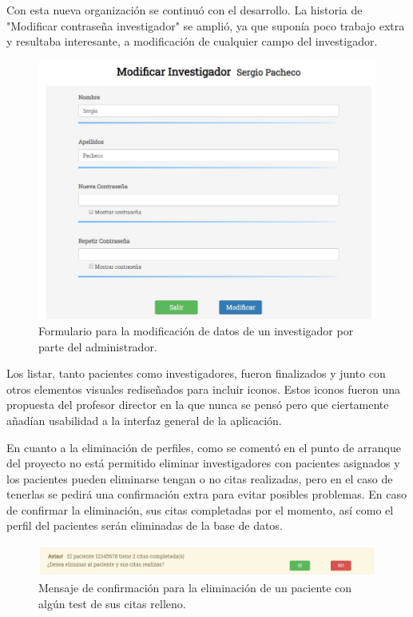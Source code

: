 Con esta nueva organización se continuó con el desarrollo. La historia de "Modificar contraseña investigador" se amplió, ya que suponía poco trabajo extra y resultaba interesante, a modificación de cualquier campo del investigador.

\begin{figure}[h]
    \centering
     \includegraphics[width=1\textwidth]{images/modificarInvestigador.jpg}
    \caption{Formulario para la modificación de datos de un investigador por parte del administrador.}
\end{figure}

Los listar, tanto pacientes como investigadores, fueron finalizados y junto con otros elementos visuales rediseñados para incluir iconos. Estos iconos fueron una propuesta del profesor director en la que nunca se pensó pero que ciertamente añadían usabilidad a la interfaz general de la aplicación.\newline

En cuanto a la eliminación de perfiles, como se comentó en el punto de arranque del proyecto no está permitido eliminar investigadores con pacientes asignados y los pacientes pueden eliminarse tengan o no citas realizadas, pero en el caso de tenerlas se pedirá una confirmación extra para evitar posibles problemas. En caso de confirmar la eliminación, sus citas completadas por el momento, así como el perfil del pacientes serán eliminadas de la base de datos.

\begin{figure}[h]
    \centering
     \includegraphics[width=1\textwidth]{images/confirmacionEliminarPaciente.jpg}
    \caption{Mensaje de confirmación para la eliminación de un paciente con algún test de sus citas relleno.}
\end{figure}
\newpage

